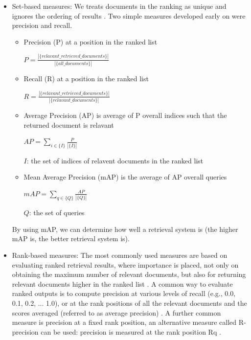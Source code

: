 \documentclass[10pt,conference,]{IEEEtran}
\begin{document}
\begin{itemize} \label{section:evaluation_ir_measurements}
\item{Set-based measures: We treats documents in the ranking as unique and ignores the ordering of results \cite{journals/ires/CloughS13}. Two simple measures developed early on were precision and recall. 
    \begin{itemize}
        \item{Precision (P) at a position in the ranked list

        $P = \frac{\left|\{relavant\_retrieved\_documents\}\right|}{\left|\{all\_documents\}\right|}$}
        \item{Recall (R) at a position in the ranked list

        $R = \frac{\left|\{relavant\_retrieved\_documents\}\right|}{\left|\{relavant\_documents\}\right|}$}
        \item{Average Precision (AP) is average of P overall indices such that the returned document is relavant

        $AP = \sum\limits_{i \in \{I\}} \frac{P}{\left|\{I\}\right|}$}

        $I$: the set of indices of relavent documents in the ranked list
        \item{Mean Average Precision (mAP) is the average of AP overall queries

        $mAP = \sum\limits_{q \in \{Q\}} \frac{AP}{\left|\{Q\}\right|} $

        $Q$: the set of queries}

    \end{itemize}

    By using mAP, we can determine how well a retrieval system is (the higher mAP is, the better retrieval system is).
}
\item{Rank-based measures: The most commonly used measures are based on evaluating ranked retrieval results, where importance is placed, not only on obtaining the maximum number of relevant documents, but also for returning relevant documents higher in the ranked list \cite{journals/ires/CloughS13}. A common way to evaluate ranked outputs is to compute precision at various levels of recall (e.g., 0.0, 0.1, 0.2, ... 1.0), or at the rank positions of all the relevant documents and the scores averaged (referred to as average precision) \cite{journals/ires/CloughS13}. A further common measure is precision at a fixed rank position, an alternative measure called R-precision can be used: precision is measured at the rank position Rq \cite{journals/ires/CloughS13}.
}
\end{itemize}
\end{document}

